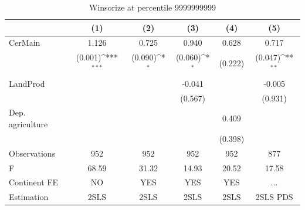 \documentclass[12pt,a4paper]{article}
\begin{document}
\begin{table}[htbp]\centering
\def\sym#1{\ifmmode^{#1}\else\(^{#1}\)\fi}
\caption{Winsorize at percentile 9999999999}
\begin{tabular}{l*{5}{c}}
\hline\hline
                &\multicolumn{1}{c}{(1)}         &\multicolumn{1}{c}{(2)}         &\multicolumn{1}{c}{(3)}         &\multicolumn{1}{c}{(4)}         &\multicolumn{1}{c}{(5)}         \\
\hline
CerMain         &    1.126         &    0.725         &    0.940         &    0.628         &    0.717         \\
                &  (0.001)\sym{***}&  (0.090)\sym{*}  &  (0.060)\sym{*}  &  (0.222)         &  (0.047)\sym{**} \\
LandProd        &                  &                  &   -0.041         &                  &   -0.005         \\
                &                  &                  &  (0.567)         &                  &  (0.931)         \\
Dep. agriculture&                  &                  &                  &    0.409         &                  \\
                &                  &                  &                  &  (0.398)         &                  \\
\hline
Observations    &      952         &      952         &      952         &      952         &      877         \\
F               &    68.59         &    31.32         &    14.93         &    20.52         &    17.58         \\
Continent FE    &       NO         &      YES         &      YES         &      YES         &      ...         \\
Estimation      &     2SLS         &     2SLS         &     2SLS         &     2SLS         & 2SLS PDS         \\
\hline\hline
\end{tabular}
\end{table}
\end{document}

